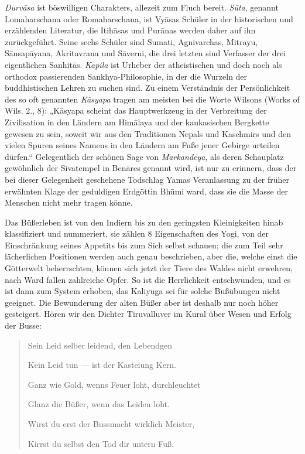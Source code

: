 \documentclass{article}
\begin{document}
\emph{Durv\={a}sa} ist böswilligen Charakters, allezeit zum Fluch bereit. \emph{S\={u}ta}, genannt Lomaharschana oder Romaharschana, ist Vy\={a}sas Schüler in der historischen und erzählenden Literatur, die Itih\={a}sas und Pur\={a}nas werden daher auf ihn zurückgeführt. Seine sechs Schüler sind Sumati, Agnivarchas, Mitrayu, S\={a}nsap\={a}yana, Akritavrana und S\={a}verni, die drei letzten sind Verfasser der drei eigentlichen Sanhit\={a}s. \emph{Kapila} ist Urheber der atheistischen und doch noch als orthodox passierenden Sankhya-Philosophie, in der die Wurzeln der buddhistischen Lehren zu suchen sind. Zu einem Verständnis der Persönlichkeit des so oft genannten \emph{K\={a}syapa} tragen am meisten bei die Worte Wilsons (Works of Wils. 2., 8): „K\={a}syapa scheint das Hauptwerkzeug in der Verbreitung der Zivilisation in den Ländern am Him\={a}laya und der kaukasischen Bergkette gewesen zu sein, soweit wir aus den Traditionen Nepals und Kaschmirs und den vielen Spuren seines Namens in den Ländern am Fuße jener Gebirge urteilen dürfen.“ Gelegentlich der schönen Sage von \emph{Markand\={e}ya}, als deren Schauplatz gewöhnlich der Sivatempel in Ben\={a}res genannt wird, ist nur zu erinnern, dass der bei dieser Gelegenheit geschehene Todschlag Yamas Veranlassung zu der früher erwähnten Klage der geduldigen Erdgöttin Bh\={u}mi ward, dass sie die Masse der Menschen nicht mehr tragen könne.

Das Büßerleben ist von den Indiern bis zu den geringsten Kleinigkeiten hinab klassifiziert und nummeriert, sie zählen 8 Eigenschaften des Yogi, von der Einschränkung seines Appetits bis zum Sich selbst schauen; die zum Teil sehr lächerlichen Positionen werden auch genau beschrieben, aber die, welche einst die Götterwelt beherrschten, können sich jetzt der Tiere des Waldes nicht erwehren, nach Ward fallen zahlreiche Opfer. So ist die Herrlichkeit entschwunden, und es ist dann zum System erhoben, das Kaliyuga sei für solche Bußübungen nicht geeignet. Die Bewunderung der alten Büßer aber ist deshalb nur noch höher gesteigert. Hören wir den Dichter Tiruvalluver im Kural über Wesen und Erfolg der Busse:
\begin{quotation}\small
Sein Leid selber leidend, den Lebendgen

Kein Leid tun — ist der Kasteiung Kern.

Ganz wie Gold, wenns Feuer loht, durchleuchtet

Glanz die Büßer, wenn das Leiden loht.

Wirst du erst der Bussmacht wirklich Meister,

Kirrst du selbst den Tod dir untern Fuß.
\end{quotation}
\clearpage
\end{document}
